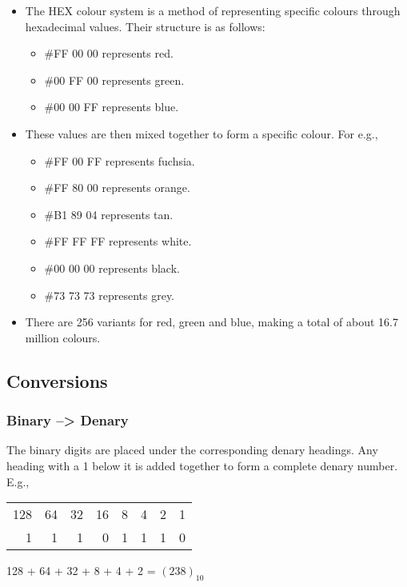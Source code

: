 \documentclass[11pt]{article}
\begin{document}
\begin{enumerate}
\begin{enumerate}
\begin{itemize}
\item The HEX colour system is a method of representing specific colours through hexadecimal values. Their structure is as follows:
\begin{itemize}
\item \#FF 00 00 represents red.
\item \#00 FF 00 represents green.
\item \#00 00 FF represents blue.
\end{itemize}
\item These values are then mixed together to form a specific colour. For e.g.,
\begin{itemize}
\item \#FF 00 FF represents fuchsia.
\item \#FF 80 00 represents orange.
\item \#B1 89 04 represents tan.
\item \#FF FF FF represents white.
\item \#00 00 00 represents black.
\item \#73 73 73 represents grey.
\end{itemize}
\item There are 256 variants for red, green and blue, making a total of about 16.7 million colours.
\end{itemize}
\end{enumerate}
\end{enumerate}
\subsection{Conversions}
\label{sec:org6b41dc9}
\subsubsection{Binary --> Denary}
\label{sec:org98c6692}
The binary digits are placed under the corresponding denary headings. Any heading with a 1 below it is added together to form a complete denary number. E.g.,
\begin{center}
\begin{tabular}{rrrrrrrr}
128 & 64 & 32 & 16 & 8 & 4 & 2 & 1\\
1 & 1 & 1 & 0 & 1 & 1 & 1 & 0\\
\end{tabular}
\end{center}
128 + 64 + 32 + 8 + 4 + 2 = \((238)_{10}\)
\end{document}
